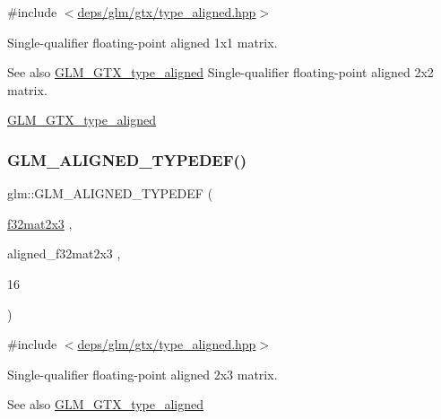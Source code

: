 {\ttfamily \#include $<$\hyperlink{gtx_2type__aligned_8hpp}{deps/glm/gtx/type\+\_\+aligned.\+hpp}$>$}

Single-\/qualifier floating-\/point aligned 1x1 matrix. \begin{DoxySeeAlso}{See also}
\hyperlink{group__gtx__type__aligned}{G\+L\+M\+\_\+\+G\+T\+X\+\_\+type\+\_\+aligned} Single-\/qualifier floating-\/point aligned 2x2 matrix. 

\hyperlink{group__gtx__type__aligned}{G\+L\+M\+\_\+\+G\+T\+X\+\_\+type\+\_\+aligned} 
\end{DoxySeeAlso}
\mbox{\label{group__gtx__type__aligned_ga1558a48b3934011b52612809f443e46d}} 
\subsubsection{\texorpdfstring{G\+L\+M\+\_\+\+A\+L\+I\+G\+N\+E\+D\+\_\+\+T\+Y\+P\+E\+D\+E\+F()}{GLM\_ALIGNED\_TYPEDEF()}\hspace{0.1cm}{\footnotesize\ttfamily [185/209]}}
{\footnotesize\ttfamily glm\+::\+G\+L\+M\+\_\+\+A\+L\+I\+G\+N\+E\+D\+\_\+\+T\+Y\+P\+E\+D\+EF (\begin{DoxyParamCaption}\item[{\hyperlink{group__gtc__type__precision_ga1f5a1129669d427f5fbc5f02ff52c366}{f32mat2x3}}]{,  }\item[{aligned\+\_\+f32mat2x3}]{,  }\item[{16}]{ }\end{DoxyParamCaption})}



{\ttfamily \#include $<$\hyperlink{gtx_2type__aligned_8hpp}{deps/glm/gtx/type\+\_\+aligned.\+hpp}$>$}

Single-\/qualifier floating-\/point aligned 2x3 matrix. \begin{DoxySeeAlso}{See also}
\hyperlink{group__gtx__type__aligned}{G\+L\+M\+\_\+\+G\+T\+X\+\_\+type\+\_\+aligned} 
\end{DoxySeeAlso}
\mbox{\label{group__gtx__type__aligned_gaa52e5732daa62851627021ad551c7680}} 
